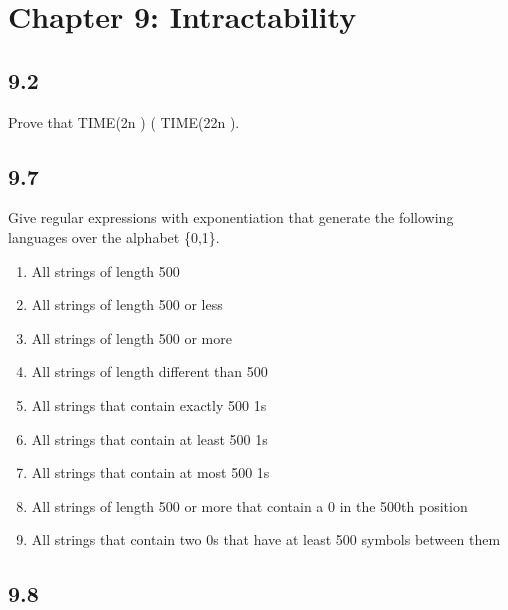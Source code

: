 \section*{Chapter 9: Intractability}

\subsection*{9.2}

Prove that TIME(2n ) ( TIME(22n ).


\subsection*{9.7}

Give regular expressions with exponentiation that generate the following languages over the alphabet \{0,1\}.

\begin{enumerate}[label=(\alph*), leftmargin=2.5em]

\item All strings of length 500

\item All strings of length 500 or less

\item All strings of length 500 or more

\item All strings of length different than 500

\item All strings that contain exactly 500 1s

\item All strings that contain at least 500 1s

\item All strings that contain at most 500 1s

\item All strings of length 500 or more that contain a 0 in the 500th position

\item All strings that contain two 0s that have at least 500 symbols between them

\end{enumerate}


\subsection*{9.8}

